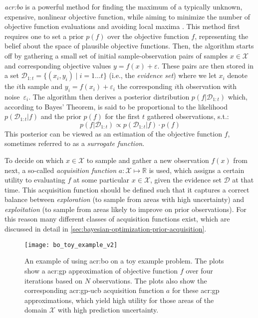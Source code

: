 \textit{\acrfull{acr:bo}} is a powerful method for finding the maximum of a typically unknown, expensive, nonlinear objective function, while aiming to minimize the number of objective function evaluations and avoiding local maxima \cite{Brochu2010}.
This method first requires one to set a prior $p(f)$ over the objective function $f$, representing the belief about the space of plausible objective functions.
Then, the algorithm starts off by gathering a small set of initial sample-observation pairs of samples $x \in \mathcal{X}$ and corresponding objective values $y = f(x) + \varepsilon$.
These pairs are then stored in a set $\mathcal{D}_{1:t} = \{(x_i, y_i) \mid i = 1 \ldots t\}$ (i.e., the \textit{evidence set}) where we let $x_i$ denote the $i$th sample and $y_i = f(x_i) + \varepsilon_i$ the corresponding $i$th observation with noise~$\varepsilon_i$.
The algorithm then derives a posterior distribution $p(f \vert \mathcal{D}_{1:t})$ which, according to Bayes' Theorem, is said to be proportional to the likelihood $p(\mathcal{D}_{1:t} \vert f)$ and the prior $p(f)$ for the first $t$ gathered observations, s.t.:
\begin{equation}
	p(f \vert \mathcal{D}_{1:t}) \propto p(\mathcal{D}_{1:t} \vert f) \cdot p(f)
\end{equation}
This posterior can be viewed as an estimation of the objective function $f$, sometimes referred to as a \textit{surrogate function}.

To decide on which $x \in \mathcal{X}$ to sample and gather a new observation $f(x)$ from next, a so-called \textit{acquisition function} $a: \mathcal{X} \mapsto \mathbb{R}$ is used, which assigns a certain utility to evaluating $f$ at some particular $x \in \mathcal{X}$, given the evidence set $\mathcal{D}$ at that time.
This acquisition function should be defined such that it captures a correct balance between \textit{exploration} (to sample from areas with high uncertainty) and \textit{exploitation} (to sample from areas likely to improve on prior observations). For this reason many different classes of acquisition functions exist, which are discussed in detail in \autoref{sec:bayesian-optimization-prior-acquisition}.

\begin{figure}
	\centering
	\texttt{[image: bo\_toy\_example\_v2]}
	\caption{An example of using \acrlong{acr:bo} on a toy example problem. The plots show a \acrshort{acr:gp} approximation of objective function $f$ over four iterations based on $N$ observations. The plots also show the corresponding \acrshort{acr:gp-ucb} acquisition function $a$ for these \acrshort{acr:gp} approximations, which yield high utility for those areas of the domain $\mathcal{X}$ with high prediction uncertainty.}
	\label{fig:bo-toy-example}
\end{figure}

